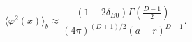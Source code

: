 \begin{equation}\label{asympleadterm}
\langle \varphi ^{2}(x)\rangle _{b}\approx \frac{(1-2\delta
_{B0})\Gamma \left( \frac{D-1}{2}\right)}{(4\pi
)^{(D+1)/2}(a-r)^{D-1}}.
\end{equation}

